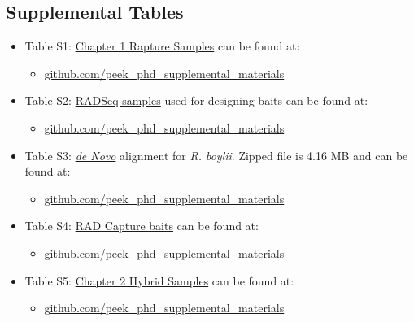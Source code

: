 \documentclass[proquest,12pt,final]{ucthesis-CA2012} %
\providecommand{\tightlist}{%
  \setlength{\itemsep}{0pt}\setlength{\parskip}{0pt}}
\begin{document}
\begin{ucmainmatter}
{\section{Supplemental Tables}\label{supptables}}
\begin{itemize}
\tightlist
\item
  Table S1: \protect\hyperlink{ch1samplecollection}{Chapter 1 Rapture
  Samples} can be found at:
  \begin{itemize}
  \tightlist
  \item
    \href{https://raw.githubusercontent.com/ryanpeek/peek_phd_supplemental_materials/master/supplemental_tables/S1_chap1_Rapture_samples.csv}{github.com/peek\_phd\_supplemental\_materials}
  \end{itemize}
\item
  Table S2: \protect\hyperlink{denovo}{RADSeq samples} used for
  designing baits can be found at:
  \begin{itemize}
  \tightlist
  \item
    \href{https://raw.githubusercontent.com/ryanpeek/peek_phd_supplemental_materials/master/supplemental_tables/S2_RADSeq-bait-samples.csv}{github.com/peek\_phd\_supplemental\_materials}
  \end{itemize}
\item
  Table S3: \protect\hyperlink{denovo}{\emph{de Novo}} alignment for
  \emph{R. boylii}. Zipped file is 4.16 MB and can be found at:
  \begin{itemize}
  \tightlist
  \item
    \href{https://github.com/ryanpeek/peek_phd_supplemental_materials/blob/master/supplemental_tables/S3_de_novo_assembly_300.fa.zip?raw=true}{github.com/peek\_phd\_supplemental\_materials}
  \end{itemize}
\item
  Table S4: \protect\hyperlink{rapture}{RAD Capture baits} can be found
  at:
  \begin{itemize}
  \tightlist
  \item
    \href{https://github.com/ryanpeek/peek_phd_supplemental_materials/blob/master/supplemental_tables/S4_capture_baits_120.fa.zip?raw=true}{github.com/peek\_phd\_supplemental\_materials}
  \end{itemize}
\item
  Table S5: \protect\hyperlink{ch2samplecollection}{Chapter 2 Hybrid
  Samples} can be found at:
  \begin{itemize}
  \tightlist
  \item
    \href{https://raw.githubusercontent.com/ryanpeek/peek_phd_supplemental_materials/master/supplemental_tables/S5_chap2_selected_samples_25k.csv}{github.com/peek\_phd\_supplemental\_materials}
  \end{itemize}
\end{itemize}
\hypertarget{code}{%
}
\end{ucmainmatter}
\end{document}
